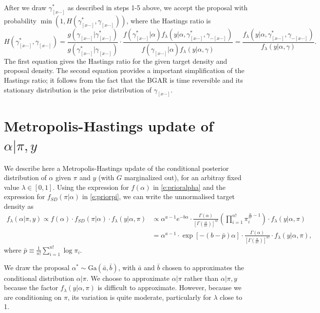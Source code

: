 \documentclass[11pt,letter]{article}
\begin{document}
After we draw $\gamma_{[x\cdots]}^*$ as described in steps 1-5 above, we accept the proposal with probability $\min(1, H(\gamma_{[x\cdots]}^*,\gamma_{[x\cdots]}))$, where the Hastings ratio is
\[
  H(\gamma_{[x\cdots]}^*,\gamma_{[x\cdots]})
  =
  \frac{g(\gamma_{[x\cdots]}|\gamma_{[x\cdots]}^*)}{g(\gamma_{[x\cdots]}^*|\gamma_{[x\cdots]})}
  \cdot
  \frac{f(\gamma_{[x\cdots]}^*|\alpha) f_\lambda(y|\alpha,\gamma_{[x\cdots]}^*,\gamma_{-[x\cdots]})}
  {f(\gamma_{[x\cdots]}|\alpha) f_\lambda(y|\alpha,\gamma)}
  =
  \frac{f_\lambda(y|\alpha,\gamma_{[x\cdots]}^*,\gamma_{-[x\cdots]})}
  {f_\lambda(y|\alpha,\gamma)}.
\]
The first equation gives the Hastings ratio for the given target density and proposal density.
The second equation provides a important simplification of the Hastings ratio; it follows from the fact that the BGAR is time reversible and its stationary distribution is the prior distribution of $\gamma_{[x\cdots]}$.

\section{Metropolis-Hastings update of $\alpha|\pi,y$}\label{s:alphadraw}

We describe here a Metropolis-Hastings update of the conditional posterior distribution of $\alpha$ given $\pi$ and $y$ (with $G$ marginalized out), for an arbitray fixed value $\lambda \in [0,1]$.
Using the expression for $f(\alpha)$ in \eqref{e:prioralpha} and the expression for $f_{SD}(\pi|\alpha)$ in \eqref{e:priorpi}, we can write the unnormalised target density as
\begin{align*}
  f_\lambda(\alpha|\pi,y)
  \propto f(\alpha) \cdot f_{SD}(\pi|\alpha) \cdot f_\lambda(y|\alpha,\pi)
  &\propto
  \alpha^{a-1} e^{-b\alpha} \cdot
  \frac{\Gamma(\alpha)}{[\Gamma(\tfrac{\alpha}{n!})]^{n!}}
  \left( \prod_{i=1}^{n!} \pi_i^{\tfrac{\alpha}{n!} - 1} \right)
  \cdot f_\lambda(y|\alpha,\pi) \\
  &=
  \alpha^{a-1} \cdot \exp[-(b - \bar{p})\alpha]
  \cdot \frac{\Gamma(\alpha)}{[\Gamma(\tfrac{\alpha}{n!})]^{n!}}
  \cdot f_\lambda(y|\alpha,\pi),
\end{align*}
where
\(
  \bar{p} \equiv \tfrac{1}{n!} \sum_{i=1}^{n!} \log \pi_i.
\)

We draw the proposal $\alpha^* \sim \mathrm{Ga}(\bar{a},\bar{b})$, with $\bar{a}$ and $\bar{b}$ chosen to approximates the conditional distribution $\alpha|\pi$.
We choose to approximate $\alpha|\pi$ rather than $\alpha|\pi,y$ because the factor $f_\lambda(y|\alpha,\pi)$ is difficult to approximate.
However, because we are conditioning on $\pi$, its variation is quite moderate, particularly for $\lambda$ close to 1.
\end{document}
